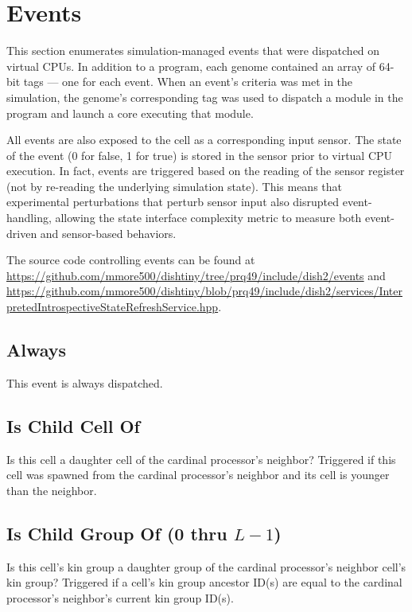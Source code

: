\section{Events}

This section enumerates simulation-managed events that were dispatched on virtual CPUs.
In addition to a program, each genome contained an array of 64-bit tags --- one for each event.
When an event's criteria was met in the simulation, the genome's corresponding tag was used to dispatch a module in the program and launch a core executing that module.

All events are also exposed to the cell as a corresponding input sensor.
The state of the event (0 for false, 1 for true) is stored in the sensor prior to virtual CPU execution.
In fact, events are triggered based on the reading of the sensor register (not by re-reading the underlying simulation state).
This means that experimental perturbations that perturb sensor input also disrupted event-handling, allowing the state interface complexity metric to measure both event-driven and sensor-based behaviors.

The source code controlling events can be found at \url{https://github.com/mmore500/dishtiny/tree/prq49/include/dish2/events} and \url{https://github.com/mmore500/dishtiny/blob/prq49/include/dish2/services/InterpretedIntrospectiveStateRefreshService.hpp}.

\subsection{Always}

This event is always dispatched.

\subsection{Is Child Cell Of}

Is this cell a daughter cell of the cardinal processor's neighbor?
Triggered if this cell was spawned from the cardinal processor's neighbor and its cell is younger than the neighbor.

\subsection{Is Child Group Of (0 thru $L-1$)}

Is this cell's kin group a daughter group of the cardinal processor's neighbor cell's kin group?
Triggered if a cell's kin group ancestor ID(s) are equal to the cardinal processor's neighbor's current kin group ID(s).

